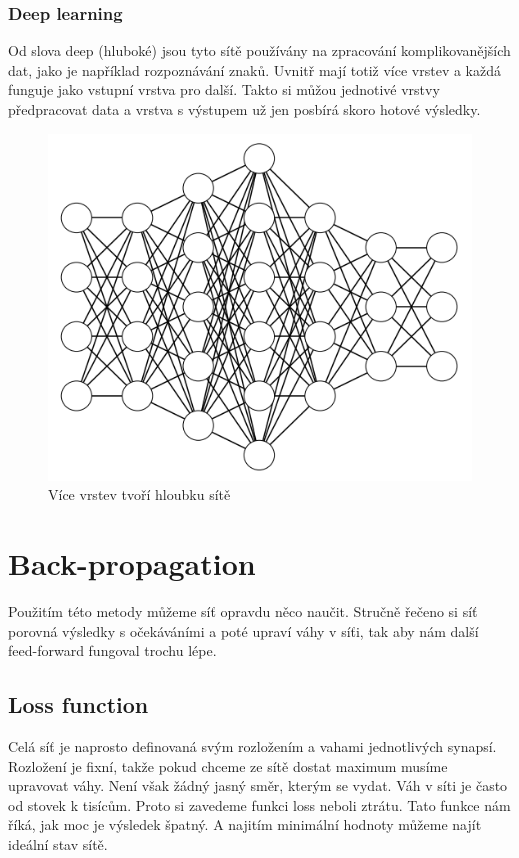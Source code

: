 \documentclass[12pt,a4paper]{report}
\begin{document}
		\subsection{Deep learning}
		Od slova deep (hluboké) jsou tyto sítě používány na zpracování komplikovanějších dat, jako je například rozpoznávání znaků. Uvnitř mají totiž více vrstev a každá funguje jako vstupní vrstva pro další. Takto si můžou jednotivé vrstvy předpracovat data a vrstva s výstupem už jen posbírá skoro hotové výsledky.
		\begin{figure}[h]
			\centering
			\includegraphics[width=15cm]{nn4-4-5-6-4-3-3}
			\caption{Více vrstev tvoří hloubku sítě}
		\end{figure}
\chapter{Back-propagation}
Použitím této metody můžeme síť opravdu něco naučit. Stručně řečeno si síť porovná výsledky s očekáváními a poté upraví váhy v síťi, tak aby nám další feed-forward fungoval trochu lépe.
	\section{Loss function}
	Celá síť je naprosto definovaná svým rozložením a vahami jednotlivých synapsí. Rozložení je fixní, takže pokud chceme ze sítě dostat maximum musíme upravovat váhy. Není však žádný jasný směr, kterým se vydat. Váh v síti je často od stovek k tisícům. Proto si zavedeme funkci loss neboli ztrátu. Tato funkce nám říká, jak moc je výsledek špatný. A najitím minimální hodnoty můžeme najít ideální stav sítě.
\end{document}

